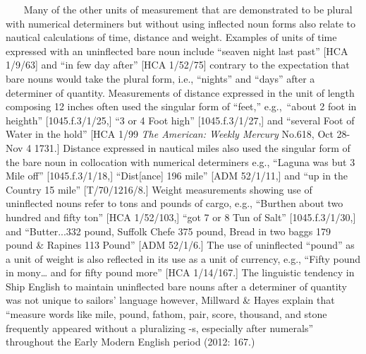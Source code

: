 ~~~  Many of the other units of measurement that are demonstrated to be plural with numerical determiners but without using inflected noun forms also relate to nautical calculations of time, distance and weight. Examples of units of time expressed with an uninflected bare noun include “seaven night last past” [HCA 1/9/63] and “in few day after” [HCA 1/52/75] contrary to the expectation that bare nouns would take the plural form, i.e., “nights” and “days” after a determiner of quantity. Measurements of distance expressed in the unit of length composing 12 inches often used the singular form of “feet,” e.g.,~“about 2 foot in heighth” [1045.f.3/1/25,] “3 or 4 Foot high” [1045.f.3/1/27,] and “several Foot of Water in the hold” [HCA 1/99 \textit{The American: Weekly Mercury} No.618, Oct 28-Nov 4 1731.] Distance expressed in nautical miles also used the singular form of the bare noun in collocation with numerical determiners e.g., “Laguna was but 3 Mile off” [1045.f.3/1/18,] “Dist[ance] 196 mile” [ADM 52/1/11,] and “up in the Country 15 mile” [T/70/1216/8.] Weight measurements showing use of uninflected nouns refer to tons and pounds of cargo, e.g., “Burthen about two hundred and fifty ton” [HCA 1/52/103,] “got 7 or 8 Tun of Salt” [1045.f.3/1/30,] and “Butter...332 pound, Suffolk Chefe 375 pound, Bread in two baggs 179 pound \& Rapines 113 Pound” [ADM 52/1/6.] The use of uninflected “pound” as a unit of weight is also reflected in its use as a unit of currency, e.g., “Fifty pound in mony… and for fifty pound more” [HCA 1/14/167.] The linguistic tendency in Ship English to maintain uninflected bare nouns after a determiner of quantity was not unique to sailors’ language however, Millward \& Hayes explain that “measure words like mile, pound, fathom, pair, score, thousand, and stone frequently appeared without a pluralizing -s, especially after numerals” throughout the Early Modern English period (2012: 167.)

